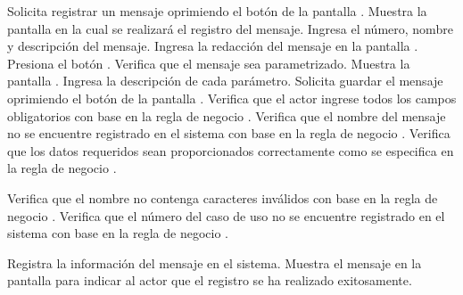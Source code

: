  \begin{UCtrayectoria}
    \UCpaso[\UCactor] Solicita registrar un mensaje oprimiendo el botón  de la pantalla .
    \UCpaso[\UCsist] Muestra la pantalla  en la cual se realizará el registro del mensaje.
    \UCpaso[\UCactor] Ingresa el número, nombre y descripción del mensaje. \label{cu9.1:ingresaDatos}
    \UCpaso[\UCactor] Ingresa la redacción del mensaje en la pantalla .  \label{cu9.1:ingresaParam}
    \UCpaso[\UCactor] Presiona el botón .
    \UCpaso[\UCsist] Verifica que el mensaje sea parametrizado. 
    \UCpaso[\UCsist] Muestra la pantalla .
    \UCpaso[\UCactor] Ingresa la descripción de cada parámetro. \label{cu9.1:ingresaPaso}
    \UCpaso[\UCactor] Solicita guardar el mensaje oprimiendo el botón  de la pantalla .  \label{cu9.1:guardarInfo}
    \UCpaso[\UCsist] Verifica que el actor ingrese todos los campos obligatorios con base en la regla de negocio  . 
    \UCpaso[\UCsist] Verifica que el nombre del mensaje no se encuentre registrado en el sistema con base en la regla de negocio  . 
    \UCpaso[\UCsist] Verifica que los datos requeridos sean proporcionados correctamente como se especifica en la regla de negocio . 
    
    \UCpaso[\UCsist] Verifica que el nombre no contenga caracteres inválidos con base en la regla de negocio . 
    \UCpaso[\UCsist] Verifica que el número del caso de uso no se encuentre registrado en el sistema con base en la regla de negocio  . 
    
    \UCpaso[\UCsist] Registra la información del mensaje en el sistema.
    \UCpaso[\UCsist] Muestra el mensaje  en la pantalla 
    para indicar al actor que el registro se ha realizado exitosamente.
 \end{UCtrayectoria}
 
